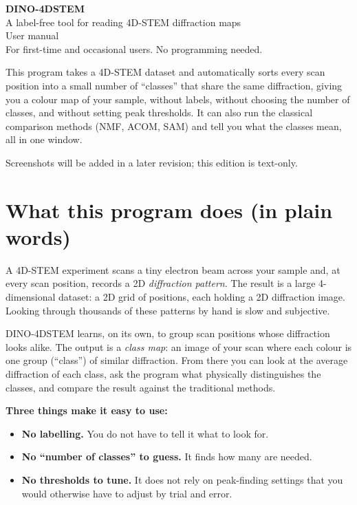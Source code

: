 \documentclass[11pt]{article}
\begin{document}
\begin{titlepage}
\vspace*{3cm}
\begin{center}
{\Huge\bfseries\color{deep} DINO-4DSTEM}\\[6pt]
{\LARGE A label-free tool for reading 4D-STEM diffraction maps}\\[10pt]
{\large User manual}\\[4pt]
{\normalsize For first-time and occasional users. No programming needed.}\\[40pt]
\colorbox{soft}{\parbox{0.85\linewidth}{\centering\vspace{4pt}
This program takes a 4D-STEM dataset and automatically sorts every scan position
into a small number of ``classes'' that share the same diffraction, giving you a
colour map of your sample, without labels, without choosing the number of classes,
and without setting peak thresholds. It can also run the classical comparison
methods (NMF, ACOM, SAM) and tell you what the classes mean, all in one window.
\vspace{4pt}}}
\vfill
{\small Screenshots will be added in a later revision; this edition is text-only.}
\end{center}
\end{titlepage}

\tableofcontents
\clearpage

\section{What this program does (in plain words)}
A 4D-STEM experiment scans a tiny electron beam across your sample and, at every
scan position, records a 2D \emph{diffraction pattern}. The result is a large
4-dimensional dataset: a 2D grid of positions, each holding a 2D diffraction
image. Looking through thousands of these patterns by hand is slow and subjective.

DINO-4DSTEM learns, on its own, to group scan positions whose diffraction looks
alike. The output is a \emph{class map}: an image of your scan where each colour is
one group (``class'') of similar diffraction. From there you can look at the
average diffraction of each class, ask the program what physically distinguishes
the classes, and compare the result against the traditional methods.

\textbf{Three things make it easy to use:}
\begin{itemize}[itemsep=2pt]
\item \textbf{No labelling.} You do not have to tell it what to look for.
\item \textbf{No ``number of classes'' to guess.} It finds how many are needed.
\item \textbf{No thresholds to tune.} It does not rely on peak-finding settings
that you would otherwise have to adjust by trial and error.
\end{itemize}
\end{document}
